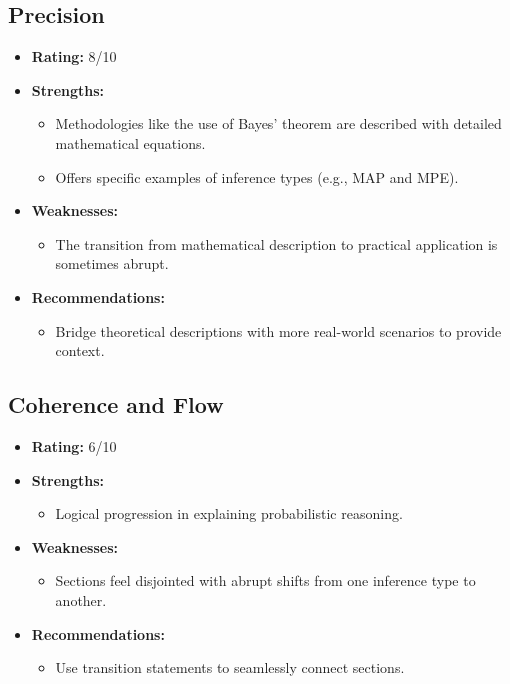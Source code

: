 \documentclass{article}
\begin{document}
\subsection{Precision}
\begin{itemize}
    \item \textbf{Rating:} 8/10
    \item \textbf{Strengths:}
        \begin{itemize}
            \item Methodologies like the use of Bayes' theorem are described with detailed mathematical equations.
            \item Offers specific examples of inference types (e.g., MAP and MPE).
        \end{itemize}
    \item \textbf{Weaknesses:}
        \begin{itemize}
            \item The transition from mathematical description to practical application is sometimes abrupt.
        \end{itemize}
    \item \textbf{Recommendations:}
        \begin{itemize}
            \item Bridge theoretical descriptions with more real-world scenarios to provide context.
        \end{itemize}
\end{itemize}

\subsection{Coherence and Flow}
\begin{itemize}
    \item \textbf{Rating:} 6/10
    \item \textbf{Strengths:}
        \begin{itemize}
            \item Logical progression in explaining probabilistic reasoning.
        \end{itemize}
    \item \textbf{Weaknesses:}
        \begin{itemize}
            \item Sections feel disjointed with abrupt shifts from one inference type to another.
        \end{itemize}
    \item \textbf{Recommendations:}
        \begin{itemize}
            \item Use transition statements to seamlessly connect sections.
        \end{itemize}
\end{itemize}
\end{document}
